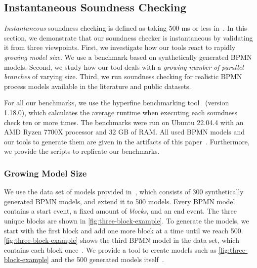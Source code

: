 \documentclass[runningheads]{llncs}
\begin{document}
\subsection{Instantaneous Soundness Checking} \label{subsec:instantaneous}
\textit{Instantaneous} soundness checking is defined as taking 500 ms or less in~\cite{fahlandAnalysisDemandInstantaneous2011}.
In this section, we demonstrate that our soundness checker is instantaneous by validating it from three viewpoints.
First, we investigate how our tools react to rapidly \textit{growing model size}.
We use a benchmark based on synthetically generated BPMN models.
Second, we study how our tool deals with a \textit{growing number of parallel branches} of varying size.
Third, we run soundness checking for realistic BPMN process models available in the literature and public datasets.

For all our benchmarks, we use the hyperfine benchmarking tool~\cite{peterHyperfine2023} (version 1.18.0), which calculates the average runtime when executing each soundness check ten or more times.
The benchmarks were run on Ubuntu 22.04.4 with an AMD Ryzen 7700X processor and 32 GB of RAM.
All used BPMN models and our tools to generate them are given in the artifacts of this paper~\cite{noauthorgivenBPM2024Artifacts2024}.
Furthermore, we provide the scripts to replicate our benchmarks.

\subsubsection{Growing Model Size}
We use the data set of models provided in~\cite{krauterHigherorderTransformationApproach2023}, which consists of 300 synthetically generated BPMN models, and extend it to 500 models.
Every BPMN model contains a start event, a fixed amount of \textit{blocks}, and an end event.
The three unique blocks are shown in \autoref{fig:three-block-example}.
To generate the models, we start with the first block and add one more block at a time until we reach 500.
\autoref{fig:three-block-example} shows the third BPMN model in the data set, which contains each block once~\cite{krauterHigherorderTransformationApproach2023}.
We provide a tool to create models such as \autoref{fig:three-block-example} and the 500 generated models itself~\cite{noauthorgivenBPM2024Artifacts2024}.
\end{document}
